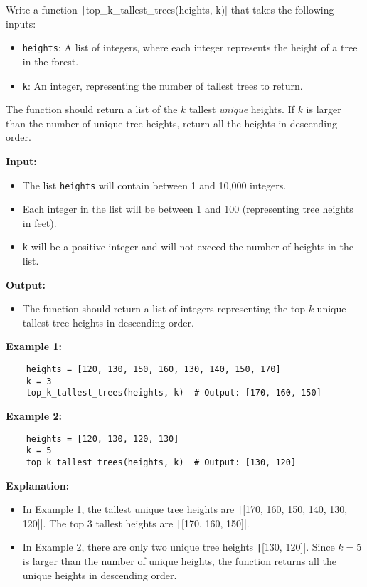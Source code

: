 \documentclass[addpoints,11pt]{exam}
\begin{document}
\begin{questions}
Write a function \texttt|top_k_tallest_trees(heights, k)| that takes the following inputs:
\begin{itemize}
	\item \texttt{heights}: A list of integers, where each integer represents the height of a tree in the forest.
	\item \texttt{k}: An integer, representing the number of tallest trees to return.
\end{itemize}

The function should return a list of the $k$ tallest \emph{unique} heights.  If $k$ is larger than the number of unique tree heights, return all the heights in descending order.

\textbf{Input:}
\begin{itemize}
	\item The list \texttt{heights} will contain between 1 and 10,000 integers.
	\item Each integer in the list will be between 1 and 100 (representing tree heights in feet).
	\item \texttt{k} will be a positive integer and will not exceed the number of heights in the list.
\end{itemize}

\textbf{Output:}
\begin{itemize}
	\item The function should return a list of integers representing the top $k$ unique tallest tree heights in descending order.
\end{itemize}

\textbf{Example 1:}
\begin{verbatim}
	heights = [120, 130, 150, 160, 130, 140, 150, 170]
	k = 3
	top_k_tallest_trees(heights, k)  # Output: [170, 160, 150]
\end{verbatim}

\textbf{Example 2:}
\begin{verbatim}
	heights = [120, 130, 120, 130]
	k = 5
	top_k_tallest_trees(heights, k)  # Output: [130, 120]
\end{verbatim}

\textbf{Explanation:}
\begin{itemize}
	\item In Example 1, the tallest unique tree heights are \texttt|[170, 160, 150, 140, 130, 120]|. The top 3 tallest heights are \texttt|[170, 160, 150]|.
	\item In Example 2, there are only two unique tree heights \texttt|[130, 120]|. Since $k=5$ is larger than the number of unique heights, the function returns all the unique heights in descending order.
\end{itemize}


\end{questions}
\end{document}
